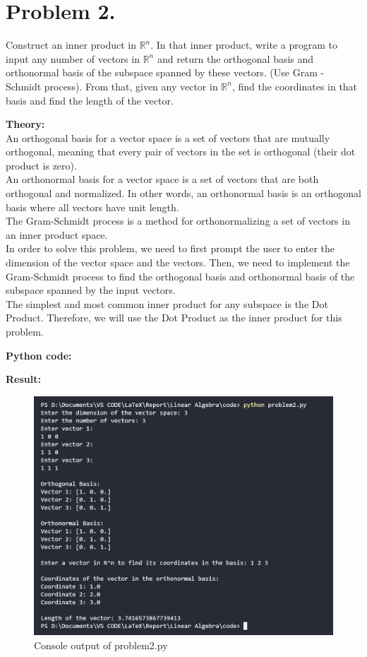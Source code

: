 \clearpage
\section{ Problem 2.}
Construct an inner product in $\mathbb{R}^n$. 
In that inner product, write a program to input any number of vectors in $\mathbb{R}^n$ and return the orthogonal
basis and orthonormal basis of the subspace spanned by these vectors. (Use Gram - Schmidt process). From that, given any vector in $\mathbb{R}^n$, find the coordinates in that basis and find the length of the vector.

\vspace*{1cm}

\textbf{Theory:}\\[6pt]
An orthogonal basis for a vector space is a set of vectors that are mutually orthogonal, meaning that every pair of vectors in the set is orthogonal (their dot product is zero). \\[6pt]
An orthonormal basis for a vector space is a set of vectors that are both orthogonal and normalized. In other words, an orthonormal basis is an orthogonal basis where all vectors have unit length. \\[6pt]
The Gram-Schmidt process is a method for orthonormalizing a set of vectors in an inner product space.\\[6pt]

In order to solve this problem, we need to first prompt the user to enter the dimension of the vector space and the vectors. Then, we need to implement the Gram-Schmidt process to find the orthogonal basis and orthonormal basis of the subspace spanned by the input vectors.\\[6pt]

The simplest and most common inner product for any subspace is the Dot Product. Therefore, we will use the Dot Product as the inner product for this problem.

\vspace*{1cm}

\textbf{Python code:}


\clearpage

\textbf{Result:}
\begin{figure}[H]
    \centering
    \includegraphics[width=16cm]{graphics/2.png}
    \caption{Console output of problem2.py}
\end{figure}
